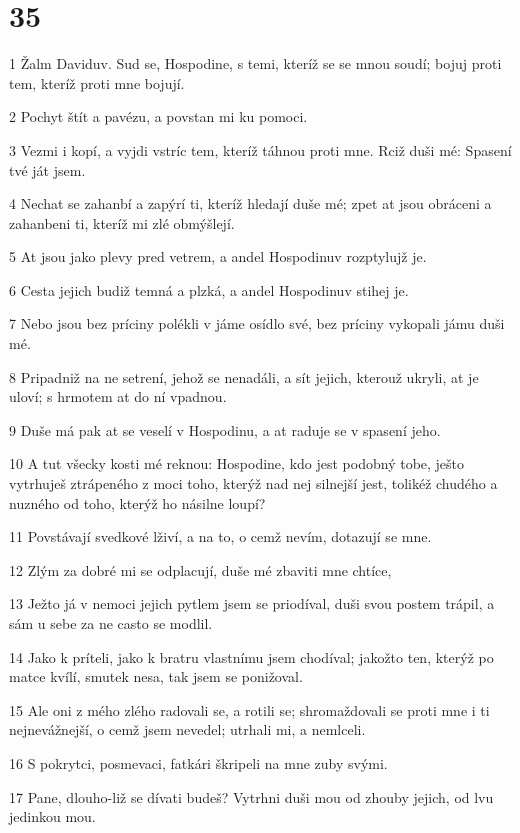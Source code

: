 \chapter{35}

\par 1 Žalm Daviduv. Sud se, Hospodine, s temi, kteríž se se mnou soudí; bojuj proti tem, kteríž proti mne bojují.
\par 2 Pochyt štít a pavézu, a povstan mi ku pomoci.
\par 3 Vezmi i kopí, a vyjdi vstríc tem, kteríž táhnou proti mne. Rciž duši mé: Spasení tvé ját jsem.
\par 4 Nechat se zahanbí a zapýrí ti, kteríž hledají duše mé; zpet at jsou obráceni a zahanbeni ti, kteríž mi zlé obmýšlejí.
\par 5 At jsou jako plevy pred vetrem, a andel Hospodinuv rozptylujž je.
\par 6 Cesta jejich budiž temná a plzká, a andel Hospodinuv stihej je.
\par 7 Nebo jsou bez príciny polékli v jáme osídlo své, bez príciny vykopali jámu duši mé.
\par 8 Pripadniž na ne setrení, jehož se nenadáli, a sít jejich, kterouž ukryli, at je uloví; s hrmotem at do ní vpadnou.
\par 9 Duše má pak at se veselí v Hospodinu, a at raduje se v spasení jeho.
\par 10 A tut všecky kosti mé reknou: Hospodine, kdo jest podobný tobe, ješto vytrhuješ ztrápeného z moci toho, kterýž nad nej silnejší jest, tolikéž chudého a nuzného od toho, kterýž ho násilne loupí?
\par 11 Povstávají svedkové lživí, a na to, o cemž nevím, dotazují se mne.
\par 12 Zlým za dobré mi se odplacují, duše mé zbaviti mne chtíce,
\par 13 Ježto já v nemoci jejich pytlem jsem se priodíval, duši svou postem trápil, a sám u sebe za ne casto se modlil.
\par 14 Jako k príteli, jako k bratru vlastnímu jsem chodíval; jakožto ten, kterýž po matce kvílí, smutek nesa, tak jsem se ponižoval.
\par 15 Ale oni z mého zlého radovali se, a rotili se; shromaždovali se proti mne i ti nejnevážnejší, o cemž jsem nevedel; utrhali mi, a nemlceli.
\par 16 S pokrytci, posmevaci, fatkári škripeli na mne zuby svými.
\par 17 Pane, dlouho-liž se dívati budeš? Vytrhni duši mou od zhouby jejich, od lvu jedinkou mou.
